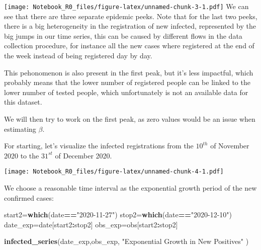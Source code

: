 \documentclass[
]{article}
\newenvironment{Shaded}{\begin{snugshade}}{\end{snugshade}}
\newcommand{\FunctionTok}[1]{\textcolor[rgb]{0.13,0.29,0.53}{\textbf{#1}}}
\newcommand{\NormalTok}[1]{#1}
\newcommand{\OtherTok}[1]{\textcolor[rgb]{0.56,0.35,0.01}{#1}}
\newcommand{\SpecialCharTok}[1]{\textcolor[rgb]{0.81,0.36,0.00}{\textbf{#1}}}
\newcommand{\StringTok}[1]{\textcolor[rgb]{0.31,0.60,0.02}{#1}}
\begin{document}
\texttt{[image: Notebook\_R0\_files/figure-latex/unnamed-chunk-3-1.pdf]}
We can see that there are three separate epidemic peeks. Note that for
the last two peeks, there is a big heterogeneity in the registration of
new infected, represented by the big jumps in our time series, this can
be caused by different flows in the data collection procedure, for
instance all the new cases where registered at the end of the week
instead of being registered day by day.

This pehonomenon is also present in the first peak, but it's less
impactful, which probably means that the lower number of registered
people can be linked to the lower number of tested people, which
unfortunately is not an available data for this dataset.

We will then try to work on the first peak, as zero values would be an
issue when estimating \(\beta\).

For starting, let's visualize the infected registrations from the
\(10^{th}\) of November 2020 to the \(31^{st}\) of December 2020.

\begin{Shaded}
\end{Shaded}

\texttt{[image: Notebook\_R0\_files/figure-latex/unnamed-chunk-4-1.pdf]}

We choose a reasonable time interval as the exponential growth period of
the new confirmed cases:

\begin{Shaded}
\begin{Highlighting}[]
\NormalTok{start2}\OtherTok{=}\FunctionTok{which}\NormalTok{(date}\SpecialCharTok{==}\StringTok{"2020{-}11{-}27"}\NormalTok{)}
\NormalTok{stop2}\OtherTok{=}\FunctionTok{which}\NormalTok{(date}\SpecialCharTok{==}\StringTok{"2020{-}12{-}10"}\NormalTok{)}
\NormalTok{date\_exp}\OtherTok{=}\NormalTok{date[start2}\SpecialCharTok{:}\NormalTok{stop2]}
\NormalTok{obs\_exp}\OtherTok{=}\NormalTok{obs[start2}\SpecialCharTok{:}\NormalTok{stop2]}

\FunctionTok{infected\_series}\NormalTok{(date\_exp,obs\_exp, }\StringTok{"Exponential Growth in New Positives"}\NormalTok{ )}
\end{Highlighting}
\end{Shaded}
\end{document}
